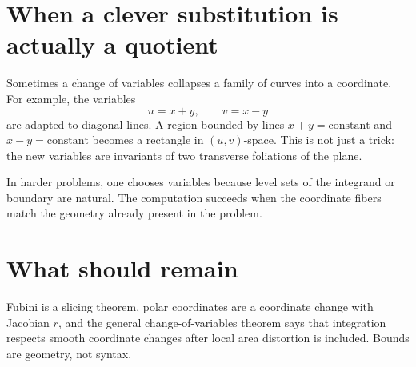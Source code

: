 \section{When a clever substitution is actually a quotient}

Sometimes a change of variables collapses a family of curves into a coordinate.  For example, the variables
\[
  u=x+y,\qquad v=x-y
\]
are adapted to diagonal lines.  A region bounded by lines \(x+y=\text{constant}\) and \(x-y=\text{constant}\) becomes a rectangle in \((u,v)\)-space.  This is not just a trick: the new variables are invariants of two transverse foliations of the plane.

In harder problems, one chooses variables because level sets of the integrand or boundary are natural.  The computation succeeds when the coordinate fibers match the geometry already present in the problem.

\section{What should remain}

Fubini is a slicing theorem, polar coordinates are a coordinate change with Jacobian \(r\), and the general change-of-variables theorem says that integration respects smooth coordinate changes after local area distortion is included.  Bounds are geometry, not syntax.
